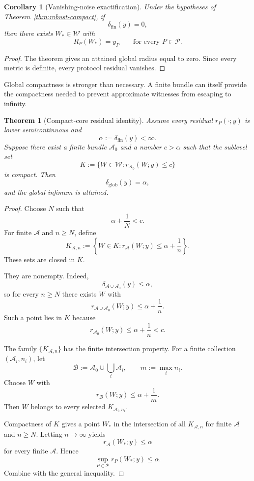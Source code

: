 \documentclass[11pt]{article}
\newtheorem{theorem}[definition]{Theorem}
\newtheorem{corollary}[definition]{Corollary}
\newcommand{\W}{\mathcal W}
\newcommand{\Pcal}{\mathcal P}
\newcommand{\Acal}{\mathcal A}
\newcommand{\Bcal}{\mathcal B}
\begin{document}
\begin{corollary}[Vanishing-noise exactification]
Under the hypotheses of Theorem~\ref{thm:robust-compact}, if
\[
\delta_{\mathrm{fin}}(y)=0,
\]
then there exists $W_\ast\in\W$ with
\[
R_P(W_\ast)=y_P
\qquad
\text{for every }P\in\Pcal.
\]
\end{corollary}

\begin{proof}
The theorem gives an attained global radius equal to zero. Since every metric
is definite, every protocol residual vanishes.
\end{proof}

Global compactness is stronger than necessary. A finite bundle can itself
provide the compactness needed to prevent approximate witnesses from escaping
to infinity.

\begin{theorem}[Compact-core residual identity]
\label{thm:compact-core}
Assume every residual $r_P(\cdot;y)$ is lower semicontinuous and
\[
\alpha:=\delta_{\mathrm{fin}}(y)<\infty.
\]
Suppose there exist a finite bundle $\Acal_0$ and a number $c>\alpha$ such
that the sublevel set
\[
K
:=
\{W\in\W:r_{\Acal_0}(W;y)\le c\}
\]
is compact. Then
\[
\delta_{\mathrm{glob}}(y)=\alpha,
\]
and the global infimum is attained.
\end{theorem}

\begin{proof}
Choose $N$ such that
\[
\alpha+\frac1N<c.
\]
For finite $\Acal$ and $n\ge N$, define
\[
K_{\Acal,n}
:=
\left\{
W\in K:
r_{\Acal}(W;y)\le\alpha+\frac1n
\right\}.
\]
These sets are closed in $K$.

They are nonempty. Indeed,
\[
\delta_{\Acal\cup\Acal_0}(y)\le\alpha,
\]
so for every $n\ge N$ there exists $W$ with
\[
r_{\Acal\cup\Acal_0}(W;y)
\le
\alpha+\frac1n.
\]
Such a point lies in $K$ because
\[
r_{\Acal_0}(W;y)
\le
\alpha+\frac1n
<c.
\]

The family $\{K_{\Acal,n}\}$ has the finite intersection property. For a
finite collection $(\Acal_i,n_i)$, let
\[
\Bcal:=\Acal_0\cup\bigcup_i\Acal_i,
\qquad
m:=\max_i n_i.
\]
Choose $W$ with
\[
r_{\Bcal}(W;y)\le\alpha+\frac1m.
\]
Then $W$ belongs to every selected $K_{\Acal_i,n_i}$.

Compactness of $K$ gives a point $W_\ast$ in the intersection of all
$K_{\Acal,n}$ for finite $\Acal$ and $n\ge N$. Letting $n\to\infty$ yields
\[
r_{\Acal}(W_\ast;y)\le\alpha
\]
for every finite $\Acal$. Hence
\[
\sup_{P\in\Pcal}r_P(W_\ast;y)\le\alpha.
\]
Combine with the general inequality.
\end{proof}
\end{document}
